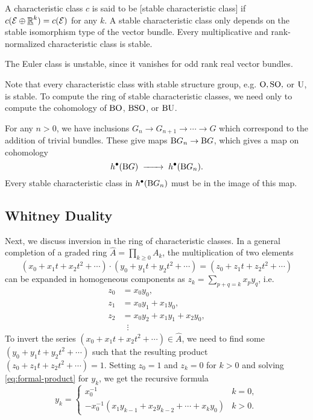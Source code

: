 \begin{definition}
	A characteristic class $c$ is said to be [stable characteristic class] if $c(\mathcal{E}\oplus \underline{\mathbb{R}}^k) = c(\mathcal{E})$ for any $k$. A stable characteristic class only depends on the stable isomorphism type of the vector bundle. Every multiplicative and rank-normalized characteristic class is stable.
\end{definition}

\begin{example}
	The Euler class is unstable, since it vanishes for odd rank real vector bundles.
\end{example}

\begin{remark*}
	Note that every characteristic class with stable structure group, e.g. $\mathrm{O}, \mathrm{SO},$ or $\mathrm{U}$, is stable. To compute the ring of stable characteristic classes, we need only to compute the cohomology of $\mathrm{BO}$, $\mathrm{BSO}$, or $\mathrm{BU}$.

	For any $n>0$, we have inclusions $G_n \to G_{n+1} \to \cdots \to G$ which correspond to the addition of trivial bundles. These give maps $\mathrm{B} G_n \to \mathrm{B} G$, which gives a map on cohomology
	\[
		h^\bullet(\BB G) \lkxto h^\bullet(\BB G_n).
	\]
	Every stable characteristic class in $h^\bullet(\mathrm{B} G_n)$ must be in the image of this map.
\end{remark*}

\subsection{Whitney Duality}

Next, we discuss inversion in the ring of characteristic classes.
In a general completion of a graded ring $\widehat{A}=\prod_{k\geq 0}A_k$, the multiplication of two elements
\[
	(x_0+x_1t +x_2t^2+\cdots)\cdot (y_0+y_1t+y_2t^2+\cdots) = (z_0 + z_1t + z_2t^2+\cdots)
\]
can be expanded in homogeneous components as $z_k=\sum_{p+q=k} x_py_q$, i.e.
\begin{equation}\label{eq:formal-product}
	\begin{aligned}
		z_0 & = x_0y_0,                 \\
		z_1 & = x_0y_1 + x_1y_0,        \\
		z_2 & = x_0y_2 + x_1y_1+x_2y_0, \\
		    & \;\;\vdots
	\end{aligned}
\end{equation}
To invert the series $(x_0+ x_1t+x_2t^2+\cdots)\in \widehat{A}$, we need to find some $(y_0+y_1t+y_2t^2+\cdots)$ such that the resulting product $(z_0+z_1t+z_2t^2+\cdots)=1$. Setting $z_0=1$ and $z_k=0$ for $k>0$ and solving \cref{eq:formal-product} for $y_k$, we get the recursive formula
\begin{equation}\label{eq:formal-inversion}
	y_k = \begin{cases}x_0^{-1}                                        & k=0,   \\
             -x_0^{-1}(x_1y_{k-1}+x_2y_{k-2}+\cdots +x_ky_0) & k > 0.
	\end{cases}
\end{equation}

